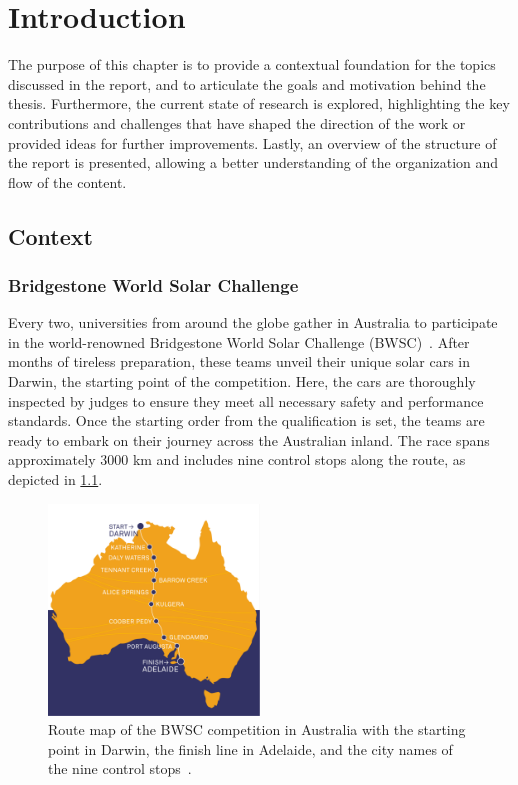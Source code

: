 
\chapter{Introduction}
\label{chp:introduction}

The purpose of this chapter is to provide a contextual foundation for the topics discussed in the report, and to articulate the goals and motivation behind the thesis. Furthermore, the current state of research is explored, highlighting the key contributions and challenges that have shaped the direction of the work or provided ideas for further improvements. Lastly, an overview of the structure of the report is presented, allowing a better understanding of the organization and flow of the content.

\section{Context}
\subsection{Bridgestone World Solar Challenge}
\label{sec:BWSC}

Every two, universities from around the globe gather in Australia to participate in the world-renowned Bridgestone World Solar Challenge (BWSC)~\cite{BridgestoneWorldSolarChallenge:2022webpage}. After months of tireless preparation, these teams unveil their unique solar cars in Darwin, the starting point of the competition. Here, the cars are thoroughly inspected by judges to ensure they meet all necessary safety and performance standards. Once the starting order from the qualification is set, the teams are ready to embark on their journey across the Australian inland. The race spans approximately 3000 km and includes nine control stops along the route, as depicted in \cref{fig:RouteMap}.
\begin{figure}[htbp]
	\centering
	\includegraphics[width=0.5\textwidth]{img/RouteMap.pdf}
	\caption{Route map of the BWSC competition in Australia with the starting point in Darwin, the finish line in Adelaide, and the city names of the nine control stops~\cite{BridgestoneWorldSolarChallenge:2022webpage}.}
	\label{fig:RouteMap}
\end{figure}

